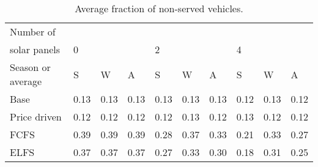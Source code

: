 \begin{table}[h]
\centering
\begin{tabular}{l|lll|lll|lll}Number of \\ solar panels&0& & &2& & &4& & \\ \hline
Season or average & S & W & A & S & W & A & S & W & A \\ \hline
Base&0.13&0.13&0.13&0.13&0.13&0.13&0.12&0.13&0.12 \\
Price driven&0.12&0.12&0.12&0.12&0.13&0.12&0.13&0.12&0.12 \\
FCFS&0.39&0.39&0.39&0.28&0.37&0.33&0.21&0.33&0.27 \\
ELFS&0.37&0.37&0.37&0.27&0.33&0.30&0.18&0.31&0.25 \\
\end{tabular}
\caption{Average fraction of non-served vehicles.}
\label{avg frac non served}
\end{table}
